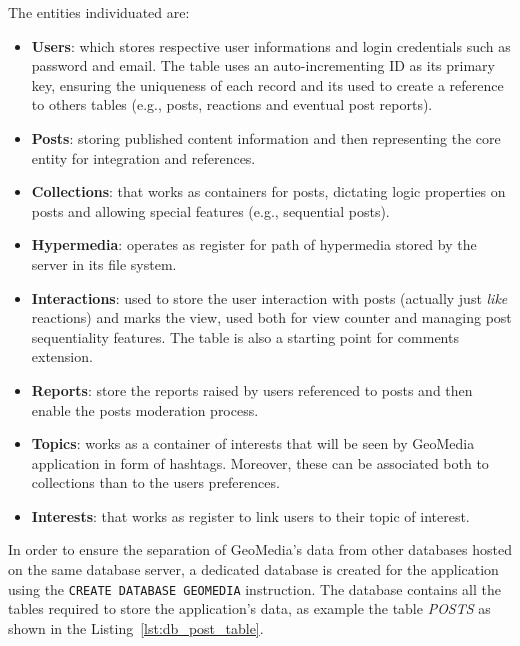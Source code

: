 The entities individuated are:
\begin{itemize}
    \item \textbf{Users}: which stores respective user informations and login credentials such as password and email. The table uses an auto-incrementing ID as its primary key, ensuring the uniqueness of each record and its used to create a reference to others tables (e.g., posts, reactions and eventual post reports).
    \item \textbf{Posts}: storing published content information and then representing the core entity for integration and references.
    \item \textbf{Collections}: that works as containers for posts, dictating logic properties on posts and allowing special features (e.g., sequential posts).
    \item \textbf{Hypermedia}: operates as register for path of hypermedia stored by the server in its file system.
    \item \textbf{Interactions}: used to store the user interaction with posts (actually just \textit{like} reactions) and marks the view, used both for view counter and managing post sequentiality features. The table is also a starting point for comments extension.
    \item \textbf{Reports}: store the reports raised by users referenced to posts and then enable the posts moderation process.
    \item \textbf{Topics}: works as a container of interests that will be seen by GeoMedia application in form of hashtags. Moreover, these can be associated both to collections than to the users preferences.
    \item \textbf{Interests}: that works as register to link users to their topic of interest.
\end{itemize}


In order to ensure the separation of GeoMedia's data from other databases hosted on the same database server, a dedicated database is created for the application using the \texttt{CREATE DATABASE GEOMEDIA} instruction. The database contains all the tables required to store the application's data, as example the table \textit{POSTS} as shown in the Listing~\ref{lst:db_post_table}.


